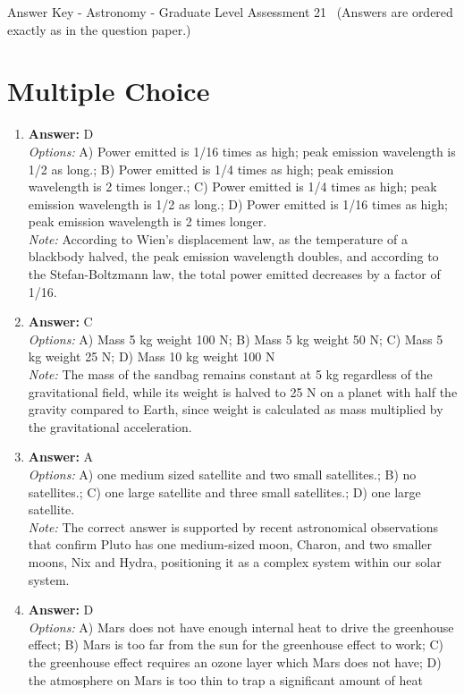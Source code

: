 \documentclass[12pt]{article}
\begin{document}
\begin{center}
Answer Key - Astronomy - Graduate Level Assessment 21 \
\small (Answers are ordered exactly as in the question paper.)
\end{center}

\section*{Multiple Choice}
\begin{enumerate}[label=\arabic*.]
\item \textbf{Answer:} D
\\ \textit{Options:} A) Power emitted is 1/16 times as high; peak emission wavelength is 1/2 as long.; B) Power emitted is 1/4 times as high; peak emission wavelength is 2 times longer.; C) Power emitted is 1/4 times as high; peak emission wavelength is 1/2 as long.; D) Power emitted is 1/16 times as high; peak emission wavelength is 2 times longer.
\\ \textit{Note:} According to Wien's displacement law, as the temperature of a blackbody halved, the peak emission wavelength doubles, and according to the Stefan-Boltzmann law, the total power emitted decreases by a factor of 1/16.
\item \textbf{Answer:} C
\\ \textit{Options:} A) Mass 5 kg weight 100 N; B) Mass 5 kg weight 50 N; C) Mass 5 kg weight 25 N; D) Mass 10 kg weight 100 N
\\ \textit{Note:} The mass of the sandbag remains constant at 5 kg regardless of the gravitational field, while its weight is halved to 25 N on a planet with half the gravity compared to Earth, since weight is calculated as mass multiplied by the gravitational acceleration.
\item \textbf{Answer:} A
\\ \textit{Options:} A) one medium sized satellite and two small satellites.; B) no satellites.; C) one large satellite and three small satellites.; D) one large satellite.
\\ \textit{Note:} The correct answer is supported by recent astronomical observations that confirm Pluto has one medium-sized moon, Charon, and two smaller moons, Nix and Hydra, positioning it as a complex system within our solar system.
\item \textbf{Answer:} D
\\ \textit{Options:} A) Mars does not have enough internal heat to drive the greenhouse effect; B) Mars is too far from the sun for the greenhouse effect to work; C) the greenhouse effect requires an ozone layer which Mars does not have; D) the atmosphere on Mars is too thin to trap a significant amount of heat

\end{enumerate}
\end{document}
